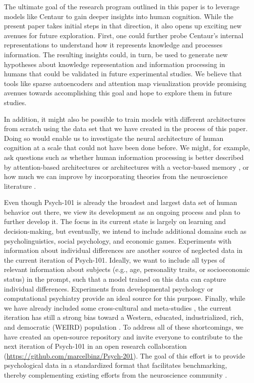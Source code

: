 \documentclass[pdflatex,sn-nature]{sn-jnl}%
\theoremstyle{thmstyleone}%
\theoremstyle{thmstyletwo}%
\theoremstyle{thmstylethree}%
\begin{document}
The ultimate goal of the research program outlined in this paper is to leverage models like Centaur to gain deeper insights into human cognition. While the present paper takes initial steps in that direction, it also opens up exciting new avenues for future exploration. First, one could further probe Centaur's internal representations to understand how it represents knowledge and processes information. The resulting insights could, in turn, be used to generate new hypotheses about knowledge representation and information processing in humans that could be validated in future experimental studies. We believe that tools like sparse autoencoders \cite{huben2024sparse} and attention map visualization \cite{Chefer_2021_CVPR} provide promising avenues towards accomplishing this goal and hope to explore them in future studies.

In addition, it might also be possible to train models with different architectures from scratch using the data set that we have created in the process of this paper. Doing so would enable us to investigate the neural architecture of human cognition at a scale that could not have been done before. We might, for example, ask questions such as whether human information processing is better described by attention-based architectures \cite{vaswani2017attention} or architectures with a vector-based memory \cite{smithsimplified}, or how much we can improve by incorporating theories from the neuroscience literature \cite{zador2023catalyzing, doerig2023neuroconnectionist}.

Even though Psych-101 is already the broadest and largest data set of human behavior out there, we view its development as an ongoing process and plan to further develop it. The focus in its current state is largely on learning and decision-making, but eventually, we intend to include additional domains such as psycholinguistics, social psychology, and economic games. Experiments with information about individual differences are another source of neglected data in the current iteration of Psych-101. Ideally, we want to include all types of relevant information about subjects (e.g., age, personality traits, or socioeconomic status) in the prompt, such that a model trained on this data can capture individual differences. Experiments from developmental psychology or computational psychiatry provide an ideal source for this purpose. Finally, while we have already included some cross-cultural and meta-studies \cite{ruggeri2022globalizability, wulff2018meta, frey2017risk, enkavi2019large}, the current iteration has still a strong bias toward a Western, educated, industrialized, rich, and democratic (WEIRD) population \cite{henrich2010most}. To address all of these shortcomings, we have created an open-source repository and invite everyone to contribute to the next iteration of Psych-101 in an open research collaboration (\url{https://github.com/marcelbinz/Psych-201}). The goal of this effort is to provide psychological data in a standardized format that facilitates benchmarking, thereby complementing existing efforts from the neuroscience community \cite{schrimpf2020integrative, schrimpf2018brain, poldrack2024past, markiewicz2021openneuro}.
\end{document}

